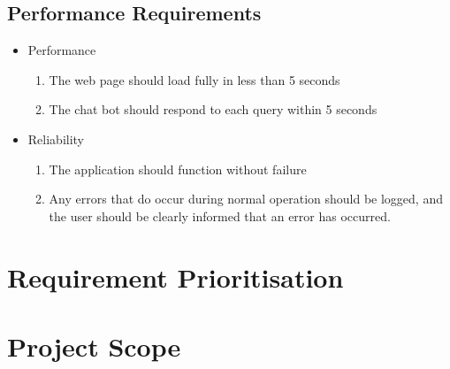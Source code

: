 \subsection{Performance Requirements}
\begin{itemize}
	\item Performance
	\begin{enumerate}[label*=P\arabic*.]
		\item The web page should load fully in less than 5 seconds
		\item The chat bot should respond to each query within 5 seconds
	\end{enumerate}
	\item Reliability
	\begin{enumerate}[resume*]
		\item The application should function without failure
		\item Any errors that do occur during normal operation should be logged, and the user should be clearly informed that an error has occurred.
	\end{enumerate}
\end{itemize}

\section{Requirement Prioritisation}
\label{sec:priority}

\section{Project Scope}
